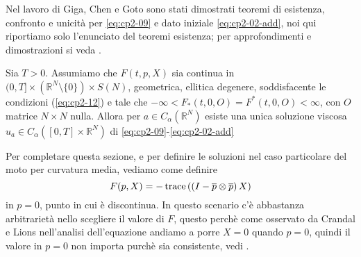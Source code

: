 Nel lavoro di Giga, Chen e Goto sono stati dimostrati teoremi di
esistenza, confronto e unicità per \eqref{eq:cp2-09} e dato iniziale
\eqref{eq:cp2-02-add}, noi qui riportiamo solo l'enunciato del
teoremi esistenza; per approfondimenti e dimostrazioni si veda \cite[][§4-6]{yun:giga}.
\begin{teorema}
Sia $T>0$. Assumiamo che $F(t,p,X)$ sia continua in $(0,T]\times(\mathbb{R}^N\setminus\{0\})\times S(N)$, geometrica, ellitica degenere, soddisfacente le condizioni (\hyperref[eq:cp2-12-1]{\ref{eq:cp2-12}\ped{$\pm$}}) e tale che $ -\infty<F_*(t,0,O) = F^*(t,0,O)<\infty$, con  $O$ matrice $N\times N$ nulla. Allora per $a\in C_{\alpha}(\mathbb{R}^N)$ esiste una unica soluzione viscosa $u_a\in C_{\alpha}([0,T]\times\mathbb{R}^N)$ di \eqref{eq:cp2-09}-\eqref{eq:cp2-02-add} 
\end{teorema}
Per completare questa sezione, e per definire le soluzioni nel caso particolare del moto per curvatura media, vediamo come definire 
\[
F(p,X)=-\operatorname{trace}\left(\left(I-\overline{p}\otimes\overline{p}\right)X\right)
\]
in $p=0$, punto in cui è discontinua. In questo scenario c'è abbastanza arbitrarietà nello scegliere il valore di $F$, questo perchè come osservato da Crandal e Lions nell'analisi dell'equazione andiamo a porre $X=0$ quando $p=0$, quindi il valore in $p=0$ non importa purchè sia consistente, vedi \cite[][§9]{crand:lion}.
